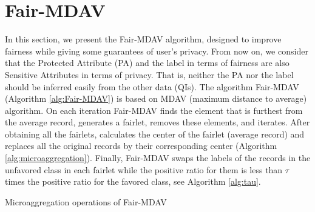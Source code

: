 \section{Fair-MDAV} 
\label{sec:our-approach}
In this section, we present the Fair-MDAV algorithm, designed to improve fairness while giving some guarantees of user's privacy. 
From now on, we consider that the Protected Attribute (PA) and the label in terms of fairness are also Sensitive Attributes in terms of privacy. That is, neither the PA nor the label should be inferred easily from the other data (QIs).
The algorithm Fair-MDAV (Algorithm \ref{alg:Fair-MDAV}) is based on MDAV (maximum distance to average) algorithm. 
On each iteration Fair-MDAV finds the element that is furthest from the average record, generates a fairlet, removes these elements, and iterates. After obtaining all the fairlets, calculates the center of the fairlet (average record) and replaces all the original records by their corresponding center (Algorithm \ref{alg:microaggregation}). Finally, Fair-MDAV swaps the labels of the records in the unfavored class in each fairlet while the positive ratio for them is less than $\tau$ times the positive ratio for the favored class, see Algorithm \ref{alg:tau}. 

\begin{algorithm}[ht]
\caption{Microaggregation operations of Fair-MDAV}
\label{alg:microaggregation}
\end{algorithm}

